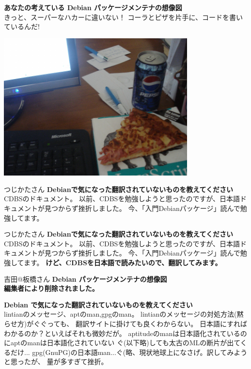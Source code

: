 \documentclass[cjk,dvipdfmx,12pt]{beamer}
\begin{document}
\begin{frame}
\textbf{あなたの考えている Debian パッケージメンテナの想像図}\\
きっと、スーパーなハカーに違いない！
コーラとピザを片手に、コードを書いているんだ!
\begin{center}
\includegraphics[width=10cm]{image200809/hack-pizza.png}
\end{center}
\end{frame}

\begin{frame}{つじかたさん}
\textbf{Debianで気になった翻訳されていないものを教えてください}\\
CDBSのドキュメント。
以前、CDBSを勉強しようと思ったのですが、日本語ドキュメントが見つからず挫折しました。
今、「入門Debianパッケージ」読んで勉強してます。
\end{frame}


\begin{frame}{つじかたさん}
\textbf{Debianで気になった翻訳されていないものを教えてください}\\
CDBSのドキュメント。
以前、CDBSを勉強しようと思ったのですが、日本語ドキュメントが見つからず挫折しました。
今、「入門Debianパッケージ」読んで勉強してます。
\textbf{けど、CDBSを日本語で読みたいので、翻訳してみます。}
\end{frame}

\begin{frame}{吉田@板橋さん}
\textbf{Debian パッケージメンテナの想像図}\\
\textbf{編集者により削除されました。}

\textbf{Debian で気になった翻訳されていないものを教えてください}\\
lintianのメッセージ、aptのman,gpgのman。
lintianのメッセージの対処方法(黙らせ方)がぐぐっても、
翻訳サイトに掛けても良くわからない。
日本語にすればわかるのか？といえばそれも微妙だが。
aptitudeのmanは日本語化されているのにaptのmanは日本語化されていない
ぐ(以下略)しても太古のMLの断片が出てくるだけ...
gpg(GnuPG)の日本語man...ぐ(略、現状地球上になさげ。訳してみようと思ったが、
量が多すぎて挫折。
\end{frame}
\end{document}

